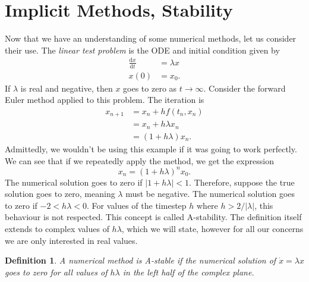 \documentclass{report}
\theoremstyle{exampstyle} \newtheorem{example}[theorem]{Example}
\theoremstyle{exampstyle} \newtheorem{remark}[theorem]{Remark}
\theoremstyle{exampstyle} \newtheorem{definition}[theorem]{Definition}
\theoremstyle{exampstyle} \newtheorem{lemma}[theorem]{Lemma}
\begin{document}
\section{Implicit Methods, Stability}


Now that we have an understanding of some numerical methods, let us consider their use.
The \textit{linear test problem} is the ODE and initial condition given by
\begin{equation*}
    \begin{aligned}
        \frac{\mathrm{d}x}{\mathrm{d}t} &= \lambda x \\
        x(0) &= x_0.
    \end{aligned}
\end{equation*}
If $\lambda$ is real and negative, then $x$ goes to zero as $t \rightarrow \infty$.
Consider the forward Euler method applied to this problem. The iteration is
\begin{align*}
    x_{n+1} &= x_n + h f(t_n, x_n) \\
    &= x_n + h \lambda  x_n \\
    &= (1 + h \lambda) x_n.
\end{align*}
Admittedly, we wouldn't be using this example if it was going to work perfectly.
We can see that if we repeatedly apply the method, we get the expression
\begin{equation*}
    x_n = (1 + h \lambda)^n x_0.
\end{equation*}
The numerical solution goes to zero if $|1 + h \lambda| < 1$. 
Therefore, suppose the true solution goes to zero, meaning $\lambda$ must be negative.
The numerical solution goes to zero if $-2 < h \lambda < 0$.
For values of the timestep $h$ where $h > 2/|\lambda|$, this behaviour is not respected.
This concept is called A-stability.
The definition itself extends to complex values of $h \lambda$, which we will state, however for all our concerns we are only interested in real values.

\begin{definition}
    A numerical method is A-stable if the numerical solution of $\dot{x} = \lambda x$ goes to zero for all values of $h \lambda $ in the left half of the complex plane.    
\end{definition}
\end{document}
